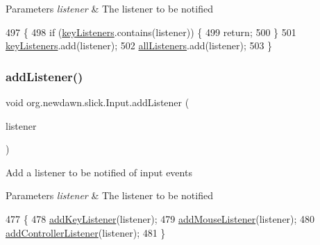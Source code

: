 \begin{DoxyParams}{Parameters}
{\em listener} & The listener to be notified \\
\hline
\end{DoxyParams}

\begin{DoxyCode}
497                                                           \{
498         \textcolor{keywordflow}{if} (\mbox{\hyperlink{classorg_1_1newdawn_1_1slick_1_1_input_a9a68e6a9e9441fea9793f57603be2f96}{keyListeners}}.contains(listener)) \{
499             \textcolor{keywordflow}{return};
500         \}
501         \mbox{\hyperlink{classorg_1_1newdawn_1_1slick_1_1_input_a9a68e6a9e9441fea9793f57603be2f96}{keyListeners}}.add(listener);
502         \mbox{\hyperlink{classorg_1_1newdawn_1_1slick_1_1_input_a26d5ed77d8b0444118d630336d0ab6d7}{allListeners}}.add(listener);
503     \}
\end{DoxyCode}
\mbox{\label{classorg_1_1newdawn_1_1slick_1_1_input_a281147c97d575c9a5a69004f31fcd596}} 
\subsubsection{\texorpdfstring{add\+Listener()}{addListener()}}
{\footnotesize\ttfamily void org.\+newdawn.\+slick.\+Input.\+add\+Listener (\begin{DoxyParamCaption}\item[{\mbox{\hyperlink{interfaceorg_1_1newdawn_1_1slick_1_1_input_listener}{Input\+Listener}}}]{listener }\end{DoxyParamCaption})\hspace{0.3cm}{\ttfamily [inline]}}

Add a listener to be notified of input events


\begin{DoxyParams}{Parameters}
{\em listener} & The listener to be notified \\
\hline
\end{DoxyParams}

\begin{DoxyCode}
477                                                     \{
478         \mbox{\hyperlink{classorg_1_1newdawn_1_1slick_1_1_input_af5ad91bb375e8834e1914f441794561b}{addKeyListener}}(listener);
479         \mbox{\hyperlink{classorg_1_1newdawn_1_1slick_1_1_input_afada327c45b45cfbf2b3eb5ad00a39aa}{addMouseListener}}(listener);
480         \mbox{\hyperlink{classorg_1_1newdawn_1_1slick_1_1_input_a365351842cce1e87223149ad5089c4c1}{addControllerListener}}(listener);
481     \}
\end{DoxyCode}
\mbox{\label{classorg_1_1newdawn_1_1slick_1_1_input_afada327c45b45cfbf2b3eb5ad00a39aa}} 
